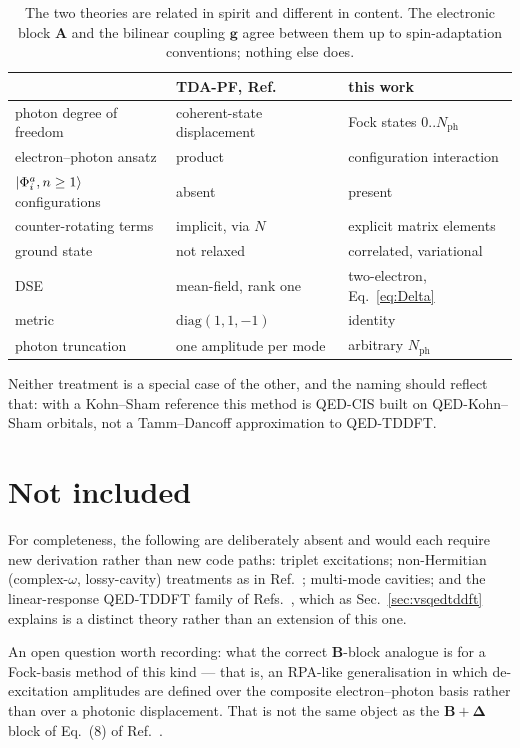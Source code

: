 \documentclass[11pt]{article}
\newcommand{\nph}{N_{\mathrm{ph}}}
\begin{document}
\begin{table}[h]
\centering
\small
\renewcommand{\arraystretch}{1.25}
\begin{tabular}{@{}lll@{}}
\toprule
 & TDA-PF, Ref.~\cite{Yang2021} & this work \\
\midrule
photon degree of freedom & coherent-state displacement & Fock states $0..\nph$ \\
electron--photon ansatz & product & configuration interaction \\
$\ket{\Phi_i^a, n\ge1}$ configurations & absent & present \\
counter-rotating terms & implicit, via $N$ & explicit matrix elements \\
ground state & not relaxed & correlated, variational \\
DSE & mean-field, rank one & two-electron, Eq.~\eqref{eq:Delta} \\
metric & $\mathrm{diag}(1,1,-1)$ & identity \\
photon truncation & one amplitude per mode & arbitrary $\nph$ \\
\bottomrule
\end{tabular}
\caption{The two theories are related in spirit and different in content. The
electronic block $\bm{A}$ and the bilinear coupling $\bm{g}$ agree between them
up to spin-adaptation conventions; nothing else does.}
\end{table}

\noindent
Neither treatment is a special case of the other, and the naming should reflect
that: with a Kohn--Sham reference this method is QED-CIS built on QED-Kohn--Sham
orbitals, not a Tamm--Dancoff approximation to QED-TDDFT.

\section{Not included}

For completeness, the following are deliberately absent and would each require
new derivation rather than new code paths: triplet excitations; non-Hermitian
(complex-$\omega$, lossy-cavity) treatments as in Ref.~\cite{McTague2022};
multi-mode cavities; and the linear-response QED-TDDFT family of
Refs.~\cite{Yang2021, Yang2022}, which as Sec.~\ref{sec:vsqedtddft} explains is
a distinct theory rather than an extension of this one.

An open question worth recording: what the correct $\bm{B}$-block analogue is for
a Fock-basis method of this kind --- that is, an RPA-like generalisation in which
de-excitation amplitudes are defined over the composite electron--photon basis
rather than over a photonic displacement. That is not the same object as the
$\bm{B} + \bm{\Delta}$ block of Eq.~(8) of Ref.~\cite{Yang2021}.
\end{document}
